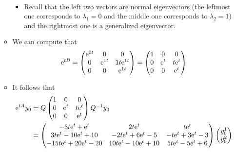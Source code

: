 \documentclass[../notes.tex]{subfiles}
\begin{document}
\begin{itemize}
\begin{itemize}
\begin{align*}
        \end{align*}
        \begin{itemize}
            \item Recall that the left two vectors are normal eigenvectors (the leftmost one corresponds to $\lambda_1=0$ and the middle one corresponds to $\lambda_2=1$) and the rightmost one is a generalized eigenvector.
        \end{itemize}
        \item We can compute that
        \begin{equation*}
            \e[tB] =
            \begin{pmatrix}
                \e[0t] & 0 & 0\\
                0 & \e[1t] & 1t\e[1t]\\
                0 & 0 & \e[1t]\\
            \end{pmatrix}
            =
            \begin{pmatrix}
                1 & 0 & 0\\
                0 & \e[t] & t\e[t]\\
                0 & 0 & \e[t]\\
            \end{pmatrix}
        \end{equation*}
        \item It follows that
        \begin{align*}
            \e[tA]y_0 &= Q
            \begin{pmatrix}
                1 & 0 & 0\\
                0 & \e[t] & t\e[t]\\
                0 & 0 & \e[t]\\
            \end{pmatrix}
            Q^{-1}y_0\\
            &=
            \begin{pmatrix}
                -3t\e[t]+\e[t] & 2t\e[t] & t\e[t]\\
                3t\e[t]-10\e[t]+10 & -2t\e[t]+6\e[t]-5 & -t\e[t]+3\e[t]-3\\
                -15t\e[t]+20\e[t]-20 & 10t\e[t]-10\e[t]+10 & 5t\e[t]-5\e[t]+6\\
            \end{pmatrix}
            \begin{pmatrix}
                y_0^1\\
                y_0^2\\

\end{pmatrix}
\end{align*}
\end{itemize}
\end{itemize}
\end{document}
